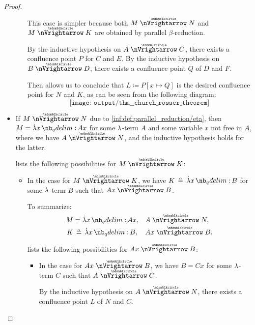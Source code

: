 \begin{proof}
\begin{itemize}
\begin{itemize}
      This case is simpler because both \( M \ppred N \) and \( M \ppred K \) are obtained by parallel \( \beta \)-reduction.

      By the inductive hypothesis on \( A \ppred C \), there exists a confluence point \( P \) for \( C \) and \( E \). By the inductive hypothesis on \( B \ppred D \), there exists a confluence point \( Q \) of \( D \) and \( F \).

      Then  allows us to conclude that \( L \coloneqq P[x \mapsto Q] \) is the desired confluence point for \( N \) and \( K \), as can be seen from the following diagram:
      \begin{equation*}
        \texttt{[image: output/thm\_\_church\_rosser\_theorem]}
      \end{equation*}
    \end{itemize}

    \item If \( M \ppred N \) due to \ref{inf:def:parallel_reduction/eta}, then \( M = \qabs x A x \) for some \( {\mathrm \lambda} \)-term \( A \) and some variable \( x \) not free in \( A \), where we have \( A \ppred N \), and the inductive hypothesis holds for the latter.

     lists the following possibilities for \( M \ppred K \):
    \begin{itemize}
      \item In the case  for \( M \ppred K \), we have \( K \aequiv \qabs x B \) for some \( {\mathrm \lambda} \)-term \( B \) such that \( Ax \ppred B \).

      To summarize:
      \begin{align*}
        M &= \qabs x A x,     &&A \ppred N, \\
        K &\aequiv \qabs x B, &&Ax \ppred B.
      \end{align*}

       lists the following possibilities for \( Ax \ppred B \):
      \begin{itemize}
        \item In the case  for \( Ax \ppred B \), we have \( B = Cx \) for some \( {\mathrm \lambda} \)-term \( C \) such that \( A \ppred C \).

        By the inductive hypothesis on \( A \ppred N \), there exists a confluence point \( L \) of \( N \) and \( C \).


\end{itemize}
\end{itemize}
\end{itemize}
\end{proof}
